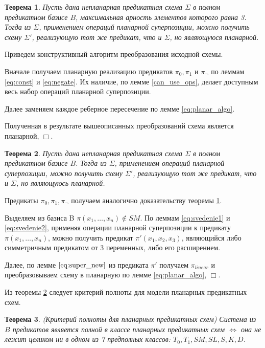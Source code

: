 \documentclass[12pt]{article}
\newtheorem{theorem}{Теорема}[section]
\newenvironment{proof}[1][Доказательство]{\begin{trivlist}
\item[\hskip \labelsep {\bfseries #1}]}{\end{trivlist}}
\begin{document}
\begin{theorem}
\label{Theo1}
Пусть дана непланарная предикатная схема $\Sigma$ в полном предикатном базисе $B$, максимальная
арность элементов которого равна 3.
Тогда из $\Sigma$, применением операций планарной суперпозиции, можно получить схему $\Sigma'$,
реализующую тот же предикат, что и $\Sigma$, но являющуюся планарной.
\end{theorem}
\begin{proof}
Приведем конструктивный алгоритм преобразования исходной схемы.

Вначале получаем планарную реализацию предикатов $\pi_0, \pi_1$ и $\pi_{\neg}$ 
по леммам \ref{eq:const} и \ref{eq:negate}. Их наличие, по лемме \ref{can_use_ops},
делает доступным весь набор операций планарной суперпозиции. 

Далее заменяем каждое реберное пересечение по лемме \ref{eq:planar_algo}. 

Полученная в результате вышеописанных преобразований схема является планарной, $\Box$.
\end{proof}

\begin{theorem}
\label{Theo2}
Пусть дана непланарная предикатная схема $\Sigma$ в полном предикатном базисе $B$. 
Тогда из $\Sigma$, применением операций планарной суперпозиции, можно получить схему $\Sigma'$,
реализующую тот же предикат, что и $\Sigma$, но являющуюсь планарной.
\end{theorem}

\begin{proof}
Предикаты $\pi_0, \pi_1, \pi_{\neg}$ получаем аналогично доказательству теоремы \ref{Theo1}.

Выделяем из базиса B $\pi(x_1, \dots, x_n) \notin SM$. По леммам \ref{eq:svedenie1} и \ref{eq:svedenie2}, 
применяя операции планарной суперпозиции к предикату $\pi(x_1, \dots, x_n)$, можно получить 
предикат $\pi'(x_1, x_2, x_3)$, являющийся либо симметричным предикатом от 3 переменных, либо его расширением. 

Далее, по лемме $\ref{eq:super_new}$ из предиката $\pi'$ получаем $\pi_{linear}$ и преобразовываем схему в планарную
по лемме \ref{eq:planar_algo}, $\Box$.
\end{proof}

Из теоремы \ref{Theo2} следует критерий полноты для модели планарных предикатных схем.

\begin{theorem}
(Критерий полноты для планарных предикатных схем)
Система из $B$ предикатов является полной в классе планарных предикатных схем $\iff$
она не лежит целиком ни в одном из 7 предполных классов: $T_0, T_1, SM, SL, S, K, D$. 
\end{theorem}
\end{document}
